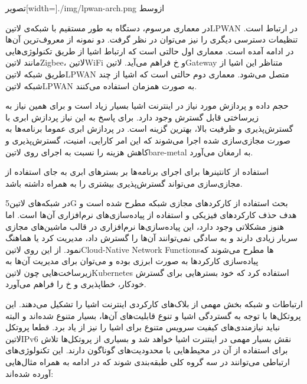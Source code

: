 ‌تصویر[width=\textwidth]{./img/lpwan-arch.png}
‌ازوسط

در معماری مرسوم، دستگاه به طور مستقیم با شبکه‌ی ‌لاتین{LPWAN} در ارتباط است.
تنظیمات دسترسی دیگری را نیز می‌توان در نظر گرفت. دو نمونه از معروف‌ترین آن‌ها
در ادامه آمده است.
معماری اول حالتی است که ارتباط اشیا از طریق تکنولوژی‌هایی مانند ‌لاتین{Zigbee}،
‌لاتین{WiFi} و ‌خ فراهم می‌آید. ‌لاتین{Gateway} متناظر این اشیا از طریق
شبکه ‌لاتین{LPWAN} متصل می‌شود.
معماری دوم حالتی است که اشیا از چند شبکه ‌لاتین{LPWAN} به صورت همزمان استفاده می‌کنند.


حجم داده و پردازش مورد نیاز در اینترنت اشیا بسیار زیاد است و برای همین نیاز به زیرساختی قابل گسترش وجود دارد.
برای پاسخ به این نیاز پردازش ابری با گسترش‌پذیری و ظرفیت بالا، بهترین گزینه است.
در پردازش ابری عموما برنامه‌ها به صورت مجازی‌سازی شده اجرا می‌شوند که این امر کارایی، امنیت، گسترش‌پذیری و کاهش هزینه
را نسبت به اجرای روی ‌لاتین{bare-metal} به ارمغان می‌آورد.

استفاده از کانتینرها برای اجرای برنامه‌ها بر بسترهای ابری به جای استفاده از مجازی‌سازی می‌تواند گسترش‌پذیری
بیشتری را به همراه داشته باشد.

در شبکه‌های ‌لاتین{5G} بحث استفاده از کارکردهای مجازی شبکه مطرح شده است و هدف حذف کارکردهای فیزیکی
و استفاده از پیاده‌سازی‌های نرم‌افزاری آن‌ها است. اما هنوز مشکلاتی وجود دارد،
این پیاده‌سازی‌ها نرم‌افزاری در قالب ماشین‌های مجازی سربار زیادی دارند
و به سادگی نمی‌توانند آن‌ها را گسترش داد، مدیریت کرد یا هماهنگ نمود.
از این روی ‌لاتین{Cloud-Native Network Functions}ها مطرح می‌شوند که پیاده‌سازی کارکردها به صورت ابرزی بوده
و می‌توان برای مدیریت آن‌ها به زیرساخت‌هایی چون ‌لاتین{Kubernetes} استفاده کرد که خود بسترهایی برای
گسترش خودکار، خطاپذیری و ‌خ را فراهم می‌آورد.


ارتباطات و شبکه بخش مهمی از بلاک‌های کارکردی اینترنت اشیا را تشکیل می‌دهند.
این پروتکل‌ها با توجه به گستردگی اشیا و تنوع قابلیت‌های آن‌ها، بسیار متنوع شده‌اند و البته نباید نیازمندی‌های کیفیت سرویس متنوع برای اشیا را نیز از یاد برد.
قطعا پروتکل ‌لاتین{IPv6} نقش بسیار مهمی در اینتنرت اشیا خواهد شد و بسیاری از پروتکل‌ها تلاش برای استفاده از آن در محیط‌هایی با محدودیت‌های گوناگون دارند.
این تکنولوژی‌های ارتباطی می‌توانند در سه گروه کلی طبقه‌بندی شوند که در ادامه به همراه مثال‌هایی آورده شده‌اند:


